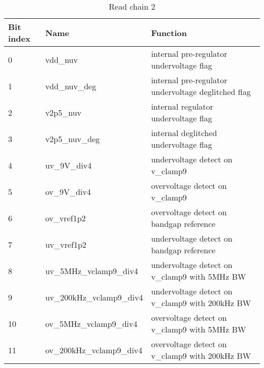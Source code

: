 \begin{table}[!htbp]
\centering
\begin{tabular}{@{}lll@{}}
\toprule
Bit index & Name & Function \\ \toprule
0	& vdd\_nuv       & internal pre-regulator undervoltage flag \\
1	& vdd\_nuv\_deg  & internal pre-regulator undervoltage deglitched flag \\
2	& v2p5\_nuv	     & internal regulator undervoltage flag \\
3	& v2p5\_nuv\_deg & internal deglitched undervoltage flag \\
4	& uv\_9V\_div4	 & undervoltage detect on v_{clamp9} \\
5	& ov\_9V\_div4	 & overvoltage detect on v_{clamp9} \\
6	& ov\_vref1p2	   & overvoltage detect on bandgap reference \\
7	& uv\_vref1p2	   & undervoltage detect on bandgap reference \\
8	&	uv\_5MHz\_vclamp9\_div4  & undervoltage detect on v_{clamp9} with 5MHz BW \\
9	&	uv\_200kHz\_vclamp9\_div4 & undervoltage detect on v_{clamp9} with 200kHz BW \\
10&	ov\_5MHz\_vclamp9\_div4 & overvoltage detect on v_{clamp9} with 5MHz BW\\
11&	ov\_200kHz\_vclamp9\_div4 & overvoltage detect on v_{clamp9} with 200kHz BW\\
\bottomrule
\end{tabular}
\caption{Read chain 2}
\label{tab:read-chain-2}
\end{table}

